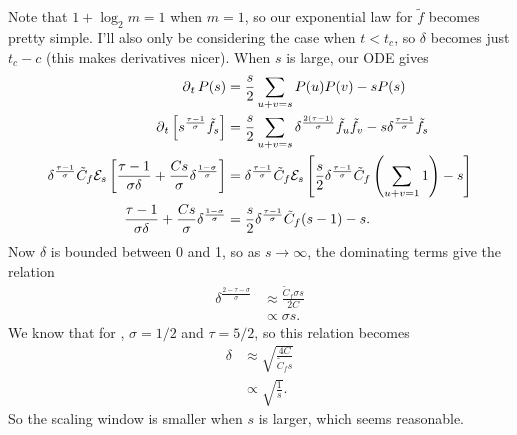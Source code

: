 \documentclass[twoside,10pt]{report}
\begin{document}
Note that $1 + \log_2 m = 1$ when $m=1$, so our exponential law for $\tilde{f}$ becomes pretty simple. I'll also only be considering the case when $t< t_{c}$, so $\delta$ becomes just $t_c - c$ (this makes derivatives nicer). When $s$ is large, our ODE gives
\begin{align*}
	\operatorname{\partial}_{t}{P}(s) &= \frac{s}{2} \sum_{u+v=s} P(u)P(v) - sP(s) \\
	\operatorname{\partial}_{t}{\left[ s^{\frac{\tau-1}{\sigma} }\tilde{f}_s \right]} &= \frac{s}{2} \sum_{u+v=s} \delta^{\frac{2(\tau-1)}{\sigma} }\tilde{f}_u \tilde{f}_v - s \delta^{\frac{\tau-1}{\sigma} }\tilde{f}_s \\
	\delta^{\frac{\tau-1}{\sigma} }\tilde{C}_{f} \mathcal{E}_{s} \left[ \frac{\tau-1}{\sigma \delta} + \frac{C s}{\sigma} \delta^{\frac{1-\sigma}{\sigma} }\right] &= \delta^{\frac{\tau-1}{\sigma} }\tilde{C}_{f} \mathcal{E}_{s} \left[ \frac{s}{2} \delta^{\frac{\tau-1}{\sigma} } \tilde{C}_{f} \left( \sum_{u+v=1}1 \right) - s \right] \\
	\frac{\tau-1}{\sigma \delta} + \frac{C s}{\sigma} \delta^{\frac{1-\sigma}{\sigma} } &= \frac{s}{2} \delta^{\frac{\tau-1}{\sigma} } \tilde{C}_{f} (s-1) - s.
\end{align*}
Now $\delta$ is bounded between 0 and 1, so as $s \to \infty$, the dominating terms give the relation
\begin{align*}
	\delta^{\frac{2-\tau-\sigma}{\sigma} } &\approx \frac{\tilde{C}_{f} \sigma s}{2 C} \\
					       &\propto \sigma s.
\end{align*}
We know that for \ER, $\sigma=1/2$ and $\tau=5/2$, so this relation becomes
\begin{align*}
	\delta &\approx \sqrt{\frac{4C}{\tilde{C}_{f} s} } \\
	       &\propto \sqrt{\frac{1}{s} } .
\end{align*}
So the scaling window is smaller when $s$ is larger, which seems reasonable.
\end{document}
